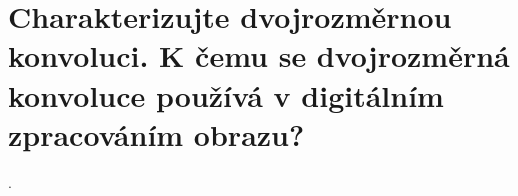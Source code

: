 \section{Charakterizujte dvojrozměrnou konvoluci. K čemu se dvojrozměrná konvoluce používá v digitálním zpracováním 
obrazu?}.